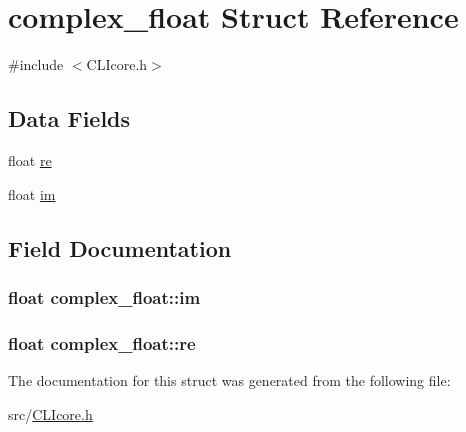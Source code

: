\hypertarget{structcomplex__float}{\section{complex\+\_\+float Struct Reference}
\label{structcomplex__float}
}


{\ttfamily \#include $<$C\+L\+Icore.\+h$>$}

\subsection*{Data Fields}
\begin{DoxyCompactItemize}
\item 
float \hyperlink{structcomplex__float_a170e8285dc5452b1c27d6a97590509dd}{re}
\item 
float \hyperlink{structcomplex__float_a96d96e19d16b6b08e43fb799c6406f0a}{im}
\end{DoxyCompactItemize}


\subsection{Field Documentation}
\hypertarget{structcomplex__float_a96d96e19d16b6b08e43fb799c6406f0a}{
\subsubsection[{im}]{\setlength{\rightskip}{0pt plus 5cm}float complex\+\_\+float\+::im}}\label{structcomplex__float_a96d96e19d16b6b08e43fb799c6406f0a}
\hypertarget{structcomplex__float_a170e8285dc5452b1c27d6a97590509dd}{
\subsubsection[{re}]{\setlength{\rightskip}{0pt plus 5cm}float complex\+\_\+float\+::re}}\label{structcomplex__float_a170e8285dc5452b1c27d6a97590509dd}


The documentation for this struct was generated from the following file\+:\begin{DoxyCompactItemize}
\item 
src/\hyperlink{CLIcore_8h}{C\+L\+Icore.\+h}\end{DoxyCompactItemize}
